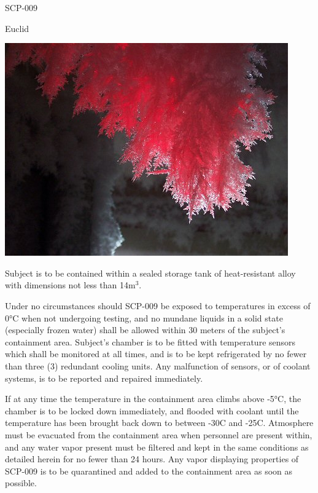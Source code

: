  SCP-009

 Euclid

\begin{center}
\includegraphics[scale=1.3]{scp/009.jpg}
\end{center}
 Subject is to be contained within a sealed storage tank of heat-resistant alloy with dimensions not less than 14m$^3$.

Under no circumstances should SCP-009 be exposed to temperatures in excess of 0°C when not undergoing testing, and no mundane liquids in a solid state (especially frozen water) shall be allowed within 30 meters of the subject's containment area. Subject's chamber is to be fitted with temperature sensors which shall be monitored at all times, and is to be kept refrigerated by no fewer than three (3) redundant cooling units. Any malfunction of sensors, or of coolant systems, is to be reported and repaired immediately.

If at any time the temperature in the containment area climbs above -5°C, the chamber is to be locked down immediately, and flooded with coolant until the temperature has been brought back down to between -30\degree C and -25\degree C. Atmosphere must be evacuated from the containment area when personnel are present within, and any water vapor present must be filtered and kept in the same conditions as detailed herein for no fewer than 24 hours. Any vapor displaying properties of SCP-009 is to be quarantined and added to the containment area as soon as possible.

